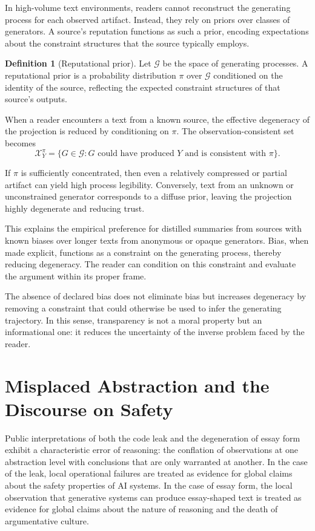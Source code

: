 \documentclass[12pt, oneside]{article}
\theoremstyle{plain}
\theoremstyle{definition}
\newtheorem{definition}[theorem]{Definition}
\theoremstyle{remark}
\newcommand{\config}{\mathcal{X}}
\begin{document}
In high-volume text environments, readers cannot reconstruct the generating process for
each observed artifact. Instead, they rely on priors over classes of generators. A source's
reputation functions as such a prior, encoding expectations about the constraint structures
that the source typically employs.

\begin{definition}[Reputational prior]
Let $\mathcal{G}$ be the space of generating processes. A reputational prior is a probability
distribution $\pi$ over $\mathcal{G}$ conditioned on the identity of the source, reflecting
the expected constraint structures of that source's outputs.
\end{definition}

When a reader encounters a text from a known source, the effective degeneracy of the
projection is reduced by conditioning on $\pi$. The observation-consistent set becomes
\[
  \config_{Y}^{\pi} = \{ G \in \mathcal{G} : G \text{ could have produced } Y \text{ and is
  consistent with } \pi \}.
\]

If $\pi$ is sufficiently concentrated, then even a relatively compressed or partial
artifact can yield high process legibility. Conversely, text from an unknown or
unconstrained generator corresponds to a diffuse prior, leaving the projection highly
degenerate and reducing trust.

This explains the empirical preference for distilled summaries from sources with known
biases over longer texts from anonymous or opaque generators. Bias, when made explicit,
functions as a constraint on the generating process, thereby reducing degeneracy. The
reader can condition on this constraint and evaluate the argument within its proper frame.

The absence of declared bias does not eliminate bias but increases degeneracy by removing
a constraint that could otherwise be used to infer the generating trajectory. In this
sense, transparency is not a moral property but an informational one: it reduces the
uncertainty of the inverse problem faced by the reader.

\section{Misplaced Abstraction and the Discourse on Safety}

Public interpretations of both the code leak and the degeneration of essay form exhibit a
characteristic error of reasoning: the conflation of observations at one abstraction level
with conclusions that are only warranted at another. In the case of the leak, local
operational failures are treated as evidence for global claims about the safety properties
of AI systems. In the case of essay form, the local observation that generative systems
can produce essay-shaped text is treated as evidence for global claims about the nature of
reasoning and the death of argumentative culture.
\end{document}
